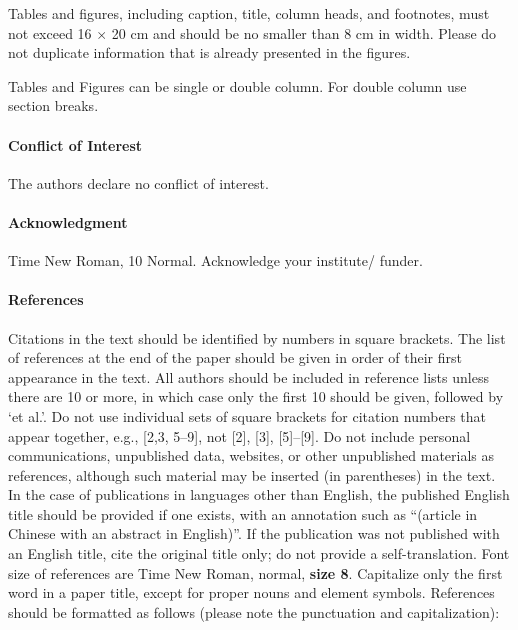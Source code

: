\documentclass{article} %
\begin{document}
\begin{multicols}{2}
Tables and figures, including caption, title, column heads, and footnotes, must not exceed 16 $\times$ 20 cm and should be no smaller than 8 cm in width. Please do not duplicate information that is already presented in the figures. \par

\noindent Tables and Figures can be single or double column. For double column use section breaks.



\paragraph{Conflict of Interest}

The authors declare no conflict of interest.


\paragraph{Acknowledgment}

Time New Roman, 10 Normal. Acknowledge your institute/ funder. 


\paragraph{References}

Citations in the text should be identified by numbers in square brackets. The list of references at the end of the paper should be given in order of their first appearance in the text. All authors should be included in reference lists unless there are 10 or more, in which case only the first 10 should be given, followed by `et al.'. Do not use individual sets of square brackets for citation numbers that appear together, e.g., [2,3, 5--9], not [2], [3], [5]--[9]. Do not include personal communications, unpublished data, websites, or other unpublished materials as references, although such material may be inserted (in parentheses) in the text. In the case of publications in languages other than English, the published English title should be provided if one exists, with an annotation such as ``(article in Chinese with an abstract in English)''. If the publication was not published with an English title, cite the original title only; do not provide a self-translation. Font size of references are Time New Roman, normal, \textbf{size 8}. Capitalize only the first word in a paper title, except for proper nouns and element symbols. References should be formatted as follows (please note the punctuation and capitalization): \\


\end{multicols}
\end{document}

